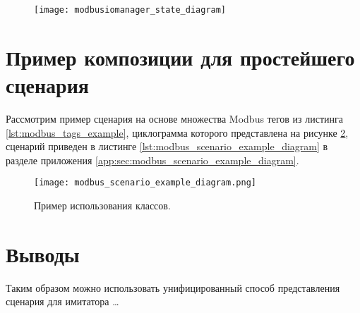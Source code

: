 \begin{center}
    \begin{figure}
        \texttt{[image: modbusiomanager\_state\_diagram]}
        \caption{}\label{fig:modbusiomanager_state_diagram}
    \end{figure}
\end{center}

\clearpage
\section{Пример композиции для простейшего сценария}

Рассмотрим пример сценария на основе множества Modbus тегов из листинга \ref{lst:modbus_tags_example},
циклограмма которого представлена на рисунке \ref{fig:modbus_scenario_example_diagram},
сценарий приведен в листинге \ref{lst:modbus_scenario_example_diagram} в разделе приложения \ref{app:sec:modbus_scenario_example_diagram}.

\begin{landscape}
    \begin{center}
        \begin{figure}
            \texttt{[image: modbus\_scenario\_example\_diagram.png]}
            \caption{Пример использования классов.}\label{fig:modbus_scenario_example_diagram}
        \end{figure}
    \end{center}
\end{landscape}


\section*{Выводы}
Таким образом можно использовать унифицированный способ представления сценария для имитатора \ldots



